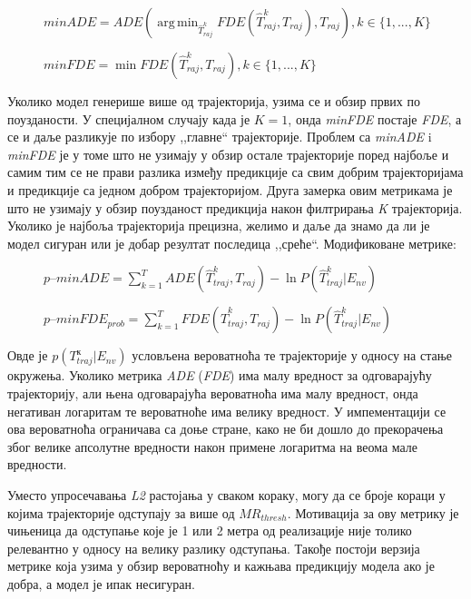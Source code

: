 \documentclass[11pt,oneside]{memoir}
\DeclareMathOperator*{\argmin}{arg\,min}
\begin{document}
\begin{figure}[h!]
  \centering
  $minADE = ADE(\displaystyle\argmin_{\hat{T}^k_{raj}} FDE(\hat{T}^k_{raj}, T_{raj}), T_{raj}), k \in \{1, ..., K\}$ 
\end{figure}

\begin{figure}[h!]
  \centering
  $minFDE = \displaystyle\min FDE(\hat{T}^k_{raj}, T_{raj}), k \in \{1, ..., K\}$
\end{figure}

Уколико модел генерише више од  трајекторија, узима се и обзир првих  по поузданости. У специјалном случају када је $K = 1$, онда 
\textit{minFDE} постаје \textit{FDE}, а  се и даље разликује по избору ,,главне`` трајекторије. 
Проблем са \textit{minADE} i \textit{minFDE} је у томе што не узимају у обзир остале трајекторије поред најбоље и самим тим се не прави разлика
између предикције са свим добрим трајекторијама и предикције са једном добром трајекторијом. \cite{Disdis} 
Друга замерка овим метрикама је што не узимају у обзир поузданост предикција након филтрирања \textit{K} трајекторија. Уколико је најбоља трајекторија
прецизна, желимо и даље да знамо да ли је модел сигуран или је добар резултат последица ,,среће``. Модификоване метрике: \cite{home}

\begin{figure}[h!]
  \centering
  $p\mbox{--}minADE = \sum^T_{k=1} ADE(\hat{T}^{k}_{traj}, T_{raj}) - \ln{P(\hat{T}^{k}_{traj}|E_{nv})}$
\end{figure}

\begin{figure}[h!]
  \centering
  $p\mbox{--}minFDE_{prob} = \sum^T_{k=1} FDE(\hat{T}^{k}_{traj}, T_{raj}) - \ln{P(\hat{T}^{k}_{traj}|E_{nv})}$
\end{figure}

Овде је $p(T^{к}_{traj}|E_{nv})$ условљена вероватноћа те трајекторије у односу на стање окружења. 
Уколико метрика \textit{ADE} (\textit{FDE}) има малу вредност за одговарајућу трајекторију, али њена одговарајућа вероватноћа има малу вредност, 
онда негативан логаритам те вероватноће има велику вредност. \cite{argoverse} У импементацији се ова вероватноћа ограничава са доње стране, како не
би дошло до прекорачења због велике апсолутне вредности након примене логаритма на веома мале вредности.

Уместо упросечавања \textit{L2} растојања у сваком кораку, могу да се броје кораци у којима трајекторије одступају за више од $MR_{thresh}$. 
Мотивација за ову метрику је чињеница да одступање које је 1 или 2 метра од реализације није толико релевантно у односу на 
велику разлику одступања. \cite{home} Такође постоји верзија метрике која узима у обзир вероватноћу и кажњава предикцију 
модела ако је добра, а модел је ипак несигуран.
\end{document}

